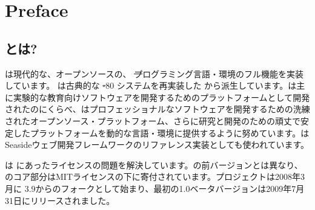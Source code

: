 \documentclass[a4paper,10pt,twoside]{book}
\begin{document}
	\sloppy
	\frontmatter
\fi
\chapter{Preface}

\section*{\pharo とは?}

\pharo は現代的な、オープンソースの、 \st プログラミング言語・環境のフル機能を実装しています。 \pharo は古典的な \st-80 システムを再実装した \squeak\cite{Inga97a}から派生しています。\squeak は主に実験的な教育向けソフトウェアを開発するためのプラットフォームとして開発されたのにくらべ、\pharo はプロフェッショナルなソフトウェアを開発するための洗練されたオープンソース・プラットフォーム、さらに研究と開発のための頑丈で安定したプラットフォームを動的な言語・環境に提供するように努めています。\pharo はSeasideウェブ開発フレームワークのリファレンス実装としても使われています。

\pharo は \squeak にあったライセンスの問題を解決しています。\squeak の前バージョンとは異なり、\pharo のコア部分はMITライセンスの下に寄付されています。\pharo プロジェクトは2008年3月に \squeak 3.9からのフォークとして始まり、最初の1.0ベータバージョンは2009年7月31日にリリースされました。
\end{document}
